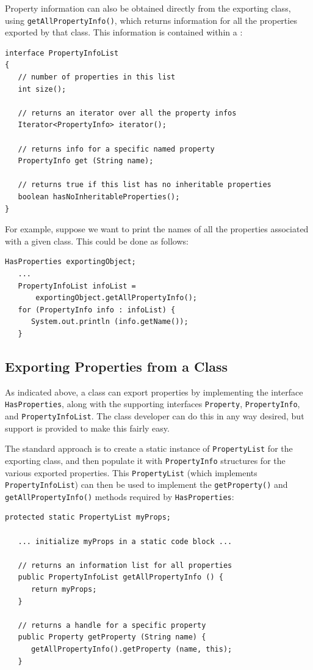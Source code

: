 \documentclass{article}
\begin{document}
Property information can also be obtained directly from the exporting
class, using {\tt getAllPropertyInfo()}, which returns
information for all the properties exported by that class. This
information is contained within a :
\begin{lstlisting}[]
interface PropertyInfoList
{
   // number of properties in this list
   int size(); 

   // returns an iterator over all the property infos
   Iterator<PropertyInfo> iterator();

   // returns info for a specific named property
   PropertyInfo get (String name);

   // returns true if this list has no inheritable properties
   boolean hasNoInheritableProperties();
}
\end{lstlisting}
For example, suppose we want to print the names of all the
properties associated with a given class. This could
be done as follows:
\begin{lstlisting}[]
   HasProperties exportingObject;
   ...
   PropertyInfoList infoList = 
       exportingObject.getAllPropertyInfo();
   for (PropertyInfo info : infoList) {
      System.out.println (info.getName());
   }
\end{lstlisting}

\label{exportingSec}
\subsection{Exporting Properties from a Class }

As indicated above, a class can export properties by implementing the
interface {\tt HasProperties}, along with the supporting interfaces
{\tt Property}, {\tt PropertyInfo}, and {\tt PropertyInfoList}.  The
class developer can do this in any way desired, but support is
provided to make this fairly easy.

The standard approach is to create a static instance of 
{\tt PropertyList} for the exporting class, and then populate it with
{\tt PropertyInfo} structures for the various exported properties. This
{\tt PropertyList} (which implements {\tt PropertyInfoList}) can then
be used to implement the {\tt getProperty()} and {\tt getAllPropertyInfo()} 
methods required by {\tt HasProperties}:
\begin{lstlisting}[]
   protected static PropertyList myProps;
 
   ... initialize myProps in a static code block ...

   // returns an information list for all properties
   public PropertyInfoList getAllPropertyInfo () {
      return myProps;
   }

   // returns a handle for a specific property
   public Property getProperty (String name) {
      getAllPropertyInfo().getProperty (name, this);
   }
\end{lstlisting}
\end{document}
